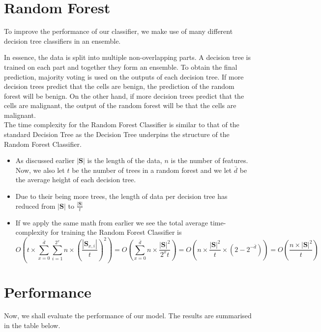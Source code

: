 \section{Random Forest}
To improve the performance of our classifier, we make use of many different decision tree classifiers in an ensemble.



In essence, the data is split into multiple non-overlapping parts. A decision tree is trained on each part and together they form an ensemble. To obtain the final prediction, majority voting is used on the outputs of each decision tree. If more decision trees predict that the cells are benign, the prediction of the random forest will be benign. On the other hand, if more decision trees predict that the cells are malignant, the output of the random forest will be that the cells are malignant. \\

 The time complexity for the Random Forest Classifier is similar to that of the standard Decision Tree as the Decision Tree underpins the structure of the Random Forest Classifier.
\begin{itemize}
	\item As discussed earlier $|\textbf{S}|$ is the length of the data, $n$ is the number of features. Now, we also let $t$ be the number of trees in a random forest and we let $\bar{d}$ be the average height of each decision tree.
	\item Due to their being more trees, the length of data per decision tree has reduced from $|\textbf{S}|$ to $\frac{|\textbf{S}|}{t}$
	\item If we apply the same math from earlier we see the total average time-complexity for training the Random Forest Classifier is 
	$$O(t\times\sum_{x=0}^{\bar{d}}\sum_{i=1}^{2^x}n\times\left(\frac{|\textbf{S}_{x,i}|}{t}\right)^2)=O(\sum_{x=0}^{\bar{d}}n\times\frac{|\textbf{S}|^2}{2^xt})=O(n\times\frac{|\textbf{S}|^2}{t}\times(2-2^{-\bar{d}}))=O(\frac{n\times|\textbf{S}|^2}{t})$$
	
\end{itemize}

\section{Performance}

Now, we shall evaluate the performance of our model. The results are summarised in the table below.

